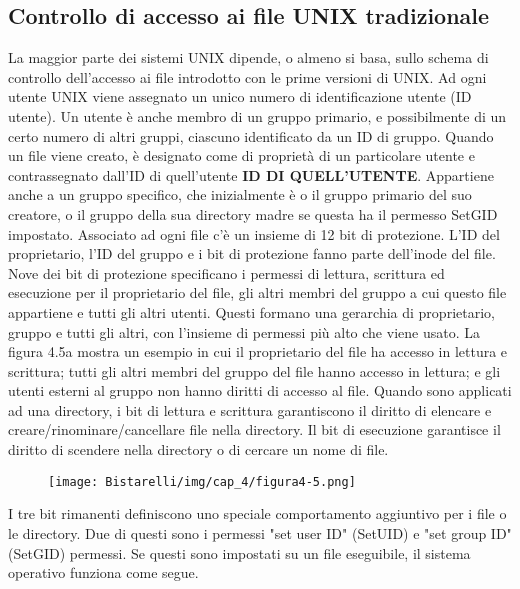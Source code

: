 \subsection{Controllo di accesso ai file UNIX tradizionale}
La maggior parte dei sistemi UNIX dipende, o almeno si basa, sullo schema di controllo dell'accesso ai file introdotto con le prime versioni di UNIX. Ad ogni utente UNIX viene assegnato un unico numero di identificazione utente (ID utente). Un utente è anche membro di un gruppo primario, e possibilmente di un certo numero di altri gruppi, ciascuno identificato da un ID di gruppo. Quando un file viene creato, è designato come di proprietà di un particolare utente e contrassegnato dall'ID di quell'utente \textbf{ID DI QUELL'UTENTE}.
\singlespacing
Appartiene anche a un gruppo specifico, che inizialmente è o il gruppo primario del suo creatore, o il gruppo della sua directory madre se questa ha il permesso SetGID impostato. Associato ad ogni file c'è un insieme di 12 bit di protezione. L'ID del proprietario, l'ID del gruppo e i bit di protezione fanno parte dell'inode del file.
\singlespacing
Nove dei bit di protezione specificano i permessi di lettura, scrittura ed esecuzione per il proprietario del file, gli altri membri del gruppo a cui questo file appartiene e tutti gli altri utenti. Questi formano una gerarchia di proprietario, gruppo e tutti gli altri, con l'insieme di permessi più alto che viene usato. La figura 4.5a mostra un esempio in cui il proprietario del file ha accesso in lettura e scrittura; tutti gli altri membri del gruppo del file hanno accesso in lettura; e gli utenti esterni al gruppo non hanno diritti di accesso al file. Quando sono applicati ad una directory, i bit di lettura e scrittura garantiscono il diritto di elencare e creare/rinominare/cancellare file nella directory. Il bit di esecuzione garantisce il diritto di scendere nella directory o di cercare un nome di file.

\begin{figure}[H]
	\centering
    \texttt{[image: Bistarelli/img/cap\_4/figura4-5.png]}
\end{figure}

I tre bit rimanenti definiscono uno speciale comportamento aggiuntivo per i file o le directory. Due di questi sono i permessi "set user ID" (SetUID) e "set group ID" (SetGID) permessi. Se questi sono impostati su un file eseguibile, il sistema operativo funziona come segue.

\singlespacing

